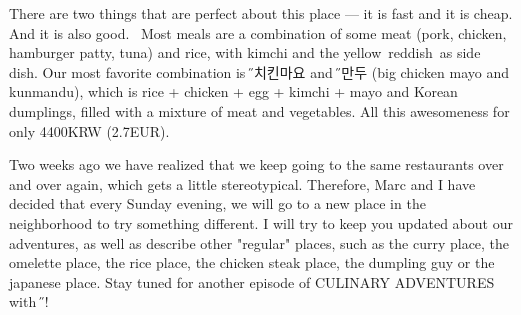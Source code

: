 \begin{post}
\begin{content}
\begin{figure}
\vspace{-12pt}
\raggedleft{}
\vspace{-24pt}
\end{figure}There are two things that are perfect about this place — it is fast and it is cheap. And it is also good.  Most meals are a combination of some meat (pork, chicken, hamburger patty, tuna) and rice, with kimchi and the yellow reddish as side dish. Our most favorite combination is {\H 빅치킨마요} and {\H 군만두} (big chicken mayo and kunmandu), which is rice + chicken + egg + kimchi + mayo and Korean dumplings, filled with a mixture of meat and vegetables. All this awesomeness for only 4400KRW (2.7EUR).

Two weeks ago we have realized that we keep going to the same restaurants over and over again, which gets a little stereotypical. Therefore, Marc and I have decided that every Sunday evening, we will go to a new place in the neighborhood to try something different. I will try to keep you updated about our adventures, as well as describe other "regular" places, such as the curry place, the omelette place, the rice place, the chicken steak place, the dumpling guy or the japanese place. Stay tuned for another episode of CULINARY ADVENTURES with {\H 얀}!
\end{content}
\end{post}
